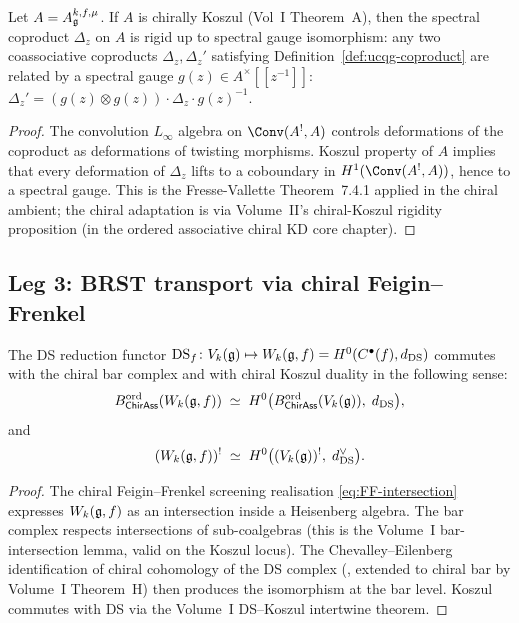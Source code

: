\begin{proposition}
\label{prop:koszul-rigid}
\ClaimStatusProvedHere
Let $A = A_{\mathfrak{g}}^{k,f,\mu}$. If $A$ is chirally Koszul (Vol~I
Theorem~A), then the spectral coproduct $\Delta_z$ on $A$ is rigid up
to spectral gauge isomorphism: any two coassociative coproducts
$\Delta_z, \Delta_z'$ satisfying
Definition~\ref{def:ucqg-coproduct} are related by a spectral gauge
$g(z)\in A^{\times}[\![z^{-1}]\!]$:
$\Delta_z' = (g(z)\otimes g(z))\cdot \Delta_z\cdot g(z)^{-1}$.
\end{proposition}

\begin{proof}
The convolution $L_{\infty}$ algebra on
$\Conv(A^{!}, A)$ controls deformations of the coproduct as
deformations of twisting morphisms. Koszul property of $A$ implies
that every deformation of $\Delta_z$ lifts to a coboundary in
$H^{1}(\Conv(A^{!}, A))$, hence to a spectral gauge. This is the
Fresse-Vallette Theorem~7.4.1 applied in the chiral ambient; the
chiral adaptation is via Volume~II's chiral-Koszul rigidity
proposition (in the ordered associative chiral KD core chapter).
\end{proof}

\subsection{Leg 3: BRST transport via chiral Feigin--Frenkel}
\label{subsec:leg-3-brst}

\begin{proposition}
\label{prop:DS-commutes}
\ClaimStatusProvedHere
The DS reduction functor $\mathrm{DS}_f\colon V_k(\mathfrak{g})\mapsto
W_k(\mathfrak{g}, f) = H^0(C^{\bullet}(f), d_{\mathrm{DS}})$ commutes with the chiral
bar complex and with chiral Koszul duality in the following sense:
\[
 B^{\mathrm{ord}}_{\mathsf{ChirAss}}(W_k(\mathfrak{g}, f))
 \;\simeq\; H^{0}\bigl(
 B^{\mathrm{ord}}_{\mathsf{ChirAss}}(V_k(\mathfrak{g})),\; d_{\mathrm{DS}}\bigr),
\]
and
\[
 (W_k(\mathfrak{g}, f))^{!}
 \;\simeq\; H^{0}\bigl(
 (V_k(\mathfrak{g}))^{!},\; d_{\mathrm{DS}}^{\vee}\bigr).
\]
\end{proposition}

\begin{proof}
The chiral Feigin--Frenkel screening realisation
\eqref{eq:FF-intersection} expresses $W_k(\mathfrak{g}, f)$ as an
intersection inside a Heisenberg algebra. The bar complex
respects intersections of sub-coalgebras (this is
the Volume~I bar-intersection lemma, valid on the Koszul locus). The
Chevalley--Eilenberg identification of chiral cohomology of the DS
complex (\cite{KacRoanWakimoto03}, extended to chiral bar by Volume~I
Theorem~H) then produces the isomorphism at the bar level. Koszul
commutes with DS via the Volume~I DS--Koszul intertwine theorem.
\end{proof}

